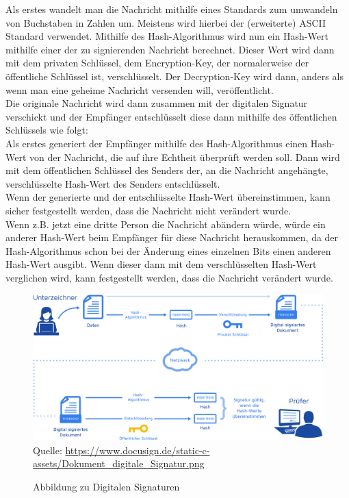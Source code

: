 \documentclass[12pt,a4paper]{scrartcl}
\newcommand*{\quelle}{%
  \footnotesize Quelle:
}
\begin{document}
Als erstes wandelt man die Nachricht mithilfe eines Standards zum umwandeln von Buchstaben in Zahlen um. Meistens wird hierbei der (erweiterte) ASCII Standard verwendet. %
Mithilfe des Hash-Algorithmus wird nun ein Hash-Wert mithilfe einer  der zu signierenden Nachricht berechnet. Dieser Wert wird dann mit dem privaten Schlüssel, dem Encryption-Key, der normalerweise der öffentliche Schlüssel ist, verschlüsselt. %
	Der Decryption-Key wird dann, anders als wenn man eine geheime Nachricht versenden will, veröffentlicht.\\
	Die originale Nachricht wird dann zusammen mit der digitalen Signatur verschickt und der Empfänger entschlüsselt diese dann mithilfe des öffentlichen Schlüssels wie folgt:\\
	Als erstes generiert der Empfänger mithilfe des Hash-Algorithmus einen Hash-Wert von der Nachricht, die auf ihre Echtheit überprüft werden soll. Dann wird mit dem öffentlichen Schlüssel des Senders der, an die Nachricht angehängte, verschlüsselte Hash-Wert des Senders entschlüsselt. \\
Wenn der generierte und der entschlüsselte Hash-Wert übereinstimmen, kann sicher festgestellt werden, dass die Nachricht nicht verändert wurde. \\
Wenn z.B. jetzt eine dritte Person die Nachricht abändern würde, würde ein anderer Hash-Wert beim Empfänger für diese Nachricht herauskommen, da der Hash-Algorithmus schon bei der Änderung eines einzelnen Bits einen anderen Hash-Wert ausgibt. Wenn dieser dann mit dem verschlüsselten Hash-Wert verglichen wird, kann festgestellt werden, dass die Nachricht verändert wurde.


\begin{figure}
\includegraphics[scale=0.45]{Dokument_digitale_Signatur} \\
\quelle\url{https://www.docusign.de/static-c-assets/Dokument_digitale_Signatur.png}
\caption{Abbildung zu Digitalen Signaturen}
\label{fig:figure3}
\end{figure}
\end{document}
